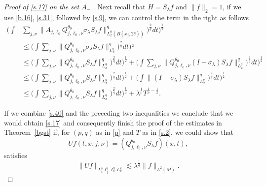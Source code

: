 \documentclass[10pt]{amsart}
\newcommand{\la}{\lambda}
\newcommand{\1}{{\bf 1}}
\begin{document}
\begin{proof}[Proof of \eqref{s.17} on the set $A_-$.]
Next recall that $H=S_\la f$ and $\|f\|_2=1$, if we use \eqref{b.16}, \eqref{s.31},  followed by \eqref{s.9}, we can control the term in the right as follows
\begin{equation}\label{s.42}
\begin{aligned}
 \big(\int&\sum_{j,\nu}\bigl\| A_{j,\ell_0} Q^{\theta_0}_{j,\ell_0,\nu}\sigma_\la S_\la f\bigr\|^{q}_{L^{q}_x(B(x_j,2\delta))}\big)^{\frac{2}{q}}dt\big)^{\frac12} \\
 &\le  \big(\int\sum_{j,\nu}\bigl\|  Q^{\theta_0}_{j,\ell_0,\nu}\sigma_\la S_\la f\bigr\|^{q}_{L^{q}_x}\big)^{\frac{2}{q}}dt\big)^{\frac12}\\
&\le  \big(\int\sum_{j,\nu}\bigl\|  Q^{\theta_0}_{j,\ell_0,\nu} S_\la f\bigr\|^{q}_{L^{q}_x}\big)^{\frac{2}{q}}dt\big)^{\frac12} +  \big(\int\sum_{j,\nu}\bigl\|  Q^{\theta_0}_{j,\ell_0,\nu}(I-\sigma_\la) S_\la f\bigr\|^{q}_{L^{q}_x}\big)^{\frac{2}{q}}dt\big)^{\frac12} 
\\ &\le   \big(\int\sum_{j,\nu}\bigl\|  Q^{\theta_0}_{j,\ell_0,\nu} S_\la f\bigr\|^{q}_{L^{q}_x}\big)^{\frac{2}{q}}dt\big)^{\frac12} +  \big(\int\bigl\|  (I-\sigma_\la) S_\la f\bigr\|^{q}_{L^{q}_x}\big)^{\frac{2}{q}}dt\big)^{\frac12} 
\\ &\le   \big(\int\sum_{j,\nu}\bigl\|  Q^{\theta_0}_{j,\ell_0,\nu} S_\la f\bigr\|^{q}_{L^{q}_x}\big)^{\frac{2}{q}}dt\big)^{\frac12} + \la^{\frac1p}T^{\frac1p-\frac12}.
\end{aligned}
\end{equation}




If we combine \eqref{s.40} and the preceding two inequalities we conclude that we would obtain \eqref{s.17} and consequently
finish the proof of the estimates in Theorem~\ref{bgst} if, for $(p,q)$ as in \eqref{p} and $T$ as in \eqref{s.2}, we could show that
\begin{equation}\label{s.43}
Uf(t,x,j,\nu)  =(Q^{\theta_0}_{j,\ell_0,\nu} S_\la f)(x,t),
\end{equation}
satisfies
\begin{equation}\label{st}
\| Uf \|_{L^p_t\ell_j^{q}\ell_\nu^{q}L^{q}_x} \lesssim \la^{\frac1{q}} \|f\|_{L^2(M)}.
\end{equation}



\end{proof}
\end{document}
